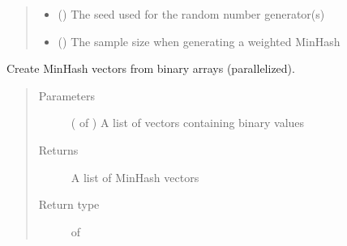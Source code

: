 \documentclass[letterpaper,10pt,english]{sphinxmanual}
\begin{document}
\begin{fulllineitems}
\begin{fulllineitems}
\begin{quote}
\begin{description}
\begin{itemize}
\item {} 
 () \textendash{} The seed used for the random number generator(s)

\item {} 
 () \textendash{} The sample size when generating a weighted MinHash

\end{itemize}

\end{description}\end{quote}

\end{fulllineitems}


\begin{fulllineitems}
\label{\detokenize{documentation:tmap.Minhash.batch_from_binary_array}}
Create MinHash vectors from binary arrays (parallelized).
\begin{quote}\begin{description}
\item[{Parameters}] \leavevmode
{} ( of ) \textendash{} A list of vectors containing binary values

\item[{Returns}] \leavevmode
A list of MinHash vectors

\item[{Return type}] \leavevmode
{} of 

\end{description}\end{quote}

\end{fulllineitems}



\end{fulllineitems}
\end{document}
